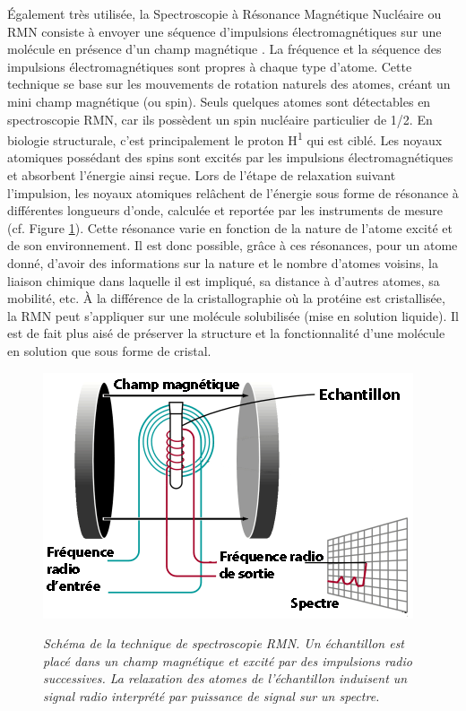 Également très utilisée, la Spectroscopie à Résonance Magnétique Nucléaire ou RMN consiste à envoyer une séquence d'impulsions électromagnétiques sur une molécule en présence d'un champ magnétique \cite{wuthrich1986nmr}. La fréquence et la séquence des impulsions électromagnétiques sont propres à chaque type d'atome. Cette technique se base sur les mouvements de rotation naturels des atomes, créant un mini champ magnétique (ou spin). Seuls quelques atomes sont détectables en spectroscopie RMN, car ils possèdent un spin nucléaire particulier de 1/2. En biologie structurale, c'est principalement le proton H\textsuperscript{1} qui est ciblé. Les noyaux atomiques possédant des spins sont excités par les impulsions électromagnétiques et absorbent l'énergie ainsi reçue. Lors de l'étape de relaxation suivant l'impulsion, les noyaux atomiques relâchent de l'énergie sous forme de résonance à différentes longueurs d'onde, calculée et reportée par les instruments de mesure (cf. Figure \ref{Fig:rmn}). Cette résonance varie en fonction de la nature de l'atome excité et de son environnement. Il est donc possible, grâce à ces résonances, pour un atome donné, d'avoir des informations sur la nature et le nombre d'atomes voisins, la liaison chimique dans laquelle il est impliqué, sa distance à d'autres atomes, sa mobilité, etc. À la différence de la cristallographie où la protéine est cristallisée, la RMN peut s'appliquer sur une molécule solubilisée (mise en solution liquide). Il est de fait plus aisé de préserver la structure et la fonctionnalité d'une molécule en solution que sous forme de cristal. 

\begin{figure}[htb]
  \centering
  {\includegraphics[width=0.55\linewidth]{./figures/ch1/rmn.png}}
    \caption[Schéma de la technique de spectroscopie RMN.]{\it Schéma de la technique de spectroscopie RMN. Un échantillon est placé dans un champ magnétique et excité par des impulsions radio successives. La relaxation des atomes de l'échantillon induisent un signal radio interprété par puissance de signal sur un spectre.}
    \label{Fig:rmn}
  \hspace{0.2cm}
\end{figure}

